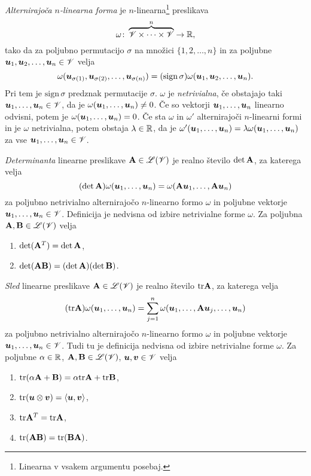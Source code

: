 \emph{Alternirajoča $n$-linearna forma} je $n$-linearna\footnote{Linearna v vsakem argumentu posebaj.} preslikava
\[ \omega\colon\overbrace{\mathscr V\times\dots\times\mathscr V}^{n}\to\mathbb R, \]
tako da za poljubno permutacijo $\sigma$ na množici $\{1,2,\dots,n\}$ in za poljubne
$\boldsymbol u_1,\boldsymbol u_2,\dots,\boldsymbol u_n\in\mathscr V$ velja
\[
	\omega(\boldsymbol u_{\sigma(1)},\boldsymbol u_{\sigma(2)},\dots,\boldsymbol u_{\sigma(n)})
	=(\mathrm{sign}\,\sigma)\omega(\boldsymbol u_1,\boldsymbol u_2,\dots,\boldsymbol u_n).
\]
Pri tem je $\mathrm{sign}\,\sigma$ predznak permutacije $\sigma$. $\omega$ je \emph{netrivialna},
če obstajajo taki $\boldsymbol u_1,\dots,\boldsymbol u_n\in\mathscr V$, da je $\omega(\boldsymbol u_1,\dots,\boldsymbol u_n)\neq 0$.
Če so vektorji $\boldsymbol u_1,\dots,\boldsymbol u_n$ linearno odvisni, potem je $\omega(\boldsymbol u_1,\dots,\boldsymbol u_n)=0$.
Če sta $\omega$ in $\omega'$ alternirajoči $n$-linearni formi in je $\omega$ netrivialna, potem
obstaja $\lambda\in\mathbb R$, da je $\omega'(\boldsymbol u_1,\dots,\boldsymbol u_n)=\lambda\omega(\boldsymbol u_1,\dots,\boldsymbol u_n)$
za vse $\boldsymbol u_1,\dots,\boldsymbol u_n\in\mathscr V$.

\emph{Determinanta} linearne preslikave $\mathbf A\in\mathscr L(\mathscr V)$ je realno število $\det\mathbf A$,
za katerega velja
\[
	(\det\mathbf A)\omega(\boldsymbol u_1,\dots,\boldsymbol u_n)=\omega(\mathbf A\boldsymbol u_1,\dots,\mathbf A\boldsymbol u_n)
\]
za poljubno netrivialno alternirajočo $n$-linearno formo $\omega$ in poljubne vektorje $\boldsymbol u_1,\dots,\boldsymbol u_n\in\mathscr V$.
Definicija je nedvisna od izbire netrivialne forme $\omega$. Za poljubna $\mathbf A,\mathbf B\in\mathscr L(\mathscr V)$ velja
\begin{enumerate}[noitemsep]
	\item $\det(\mathbf A^T)=\det\mathbf A$,
	\item $\det(\mathbf A\mathbf B)=(\det\mathbf A)(\det\mathbf B)$.
\end{enumerate}

\emph{Sled} linearne preslikave $\mathbf A\in\mathscr L(\mathscr V)$ je realno število $\mathrm{tr}\mathbf A$,
za katerega velja
\[
	(\mathrm{tr}\mathbf A)\omega(\boldsymbol u_1,\dots,\boldsymbol u_n)
	=\sum_{j=1}^n\omega(\boldsymbol u_1,\dots,\mathbf A\boldsymbol u_j,\dots,\boldsymbol u_n)
\]
za poljubno netrivialno alternirajočo $n$-linearno formo $\omega$ in poljubne vektorje $\boldsymbol u_1,\dots,\boldsymbol u_n\in\mathscr V$.
Tudi tu je definicija nedvisna od izbire netrivialne forme $\omega$.
Za poljubne $\alpha\in\mathbb R$, $\mathbf A,\mathbf B\in\mathscr L(\mathscr V)$, $\boldsymbol u,\boldsymbol v\in\mathscr V$ velja
\begin{enumerate}[noitemsep] \label{traceprop}
	\item $\mathrm{tr}(\alpha\mathbf A+\mathbf B)=\alpha\mathrm{tr}\mathbf A+\mathrm{tr}\mathbf B$,
	\item $\mathrm{tr}(\boldsymbol u\otimes\boldsymbol v)=\langle\boldsymbol u,\boldsymbol v\rangle$,
	\item $\mathrm{tr}\mathbf A^T=\mathrm{tr}\mathbf A$,
	\item $\mathrm{tr}(\mathbf A\mathbf B)=\mathrm{tr}(\mathbf B\mathbf A)$.
\end{enumerate}

